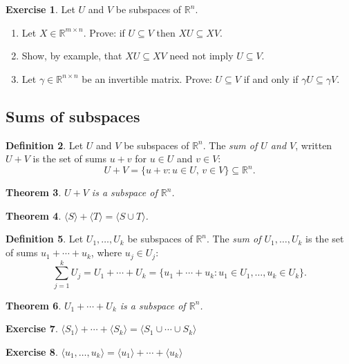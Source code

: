 \documentclass{amsart}
\newcommand{\RR}{\mathbb{R}}
\newtheorem{theorem}{Theorem}[section]
\theoremstyle{definition}
\newtheorem{definition}[theorem]{Definition}
\newtheorem{exercise}[theorem]{Exercise}
\begin{document}
\begin{exercise}\label{exercise:translation_preserves_inclusion}
Let $U$ and $V$ be subspaces of $\RR^n$.
\begin{enumerate}
\item Let $X\in\RR^{m\times n}$. Prove: if $U\subseteq V$ then $X U\subseteq X V$.
\item Show, by example, that $XU\subseteq XV$ need not imply $U\subseteq V$.
\item Let $\gamma\in\RR^{n\times n}$ be an invertible matrix. Prove: $U\subseteq V$ if and only if $\gamma U\subseteq \gamma V$. 
\end{enumerate}
\end{exercise}

\subsection{Sums of subspaces}

\begin{definition}
 Let $U$ and $V$ be subspaces of $\RR^n$.
The \emph{sum of $U$ and $V$}, written $U + V$ is the set of sums $u+v$ for $u\in U$ and $v\in V$:
$$
U + V = \{u + v : u\in U,\,v\in V\}\subseteq\RR^n.
$$
\end{definition}

\begin{theorem}
  $U+ V$ is a subspace of $\RR^n$.
\end{theorem}

\begin{theorem}
  $\langle S\rangle + \langle T\rangle = \langle S\cup T\rangle$.
\end{theorem}

\begin{definition}
  Let $U_1,\ldots,U_k$ be subspaces of $\RR^n$. The \emph{sum of $U_1, \ldots, U_k$} is the set of sums $u_1+\cdots+u_k$, where $u_j\in U_j$:
$$
\sum_{j=1}^k U_j = U_1+\cdots + U_k = \{u_1+\cdots + u_k : u_1\in U_1,\ldots, u_k\in U_k\}.
$$ 
\end{definition}

\begin{theorem}
  $U_1+\cdots + U_k$ is a subspace of $\RR^n$.
\end{theorem}

\begin{exercise}
  $\langle S_1\rangle + \cdots + \langle S_k\rangle = \langle S_1\cup\cdots\cup S_k\rangle$ 
\end{exercise}

\begin{exercise}
  $\langle u_1,\ldots,u_k\rangle = \langle u_1\rangle + \cdots + \langle u_k\rangle$
\end{exercise}
\end{document}
